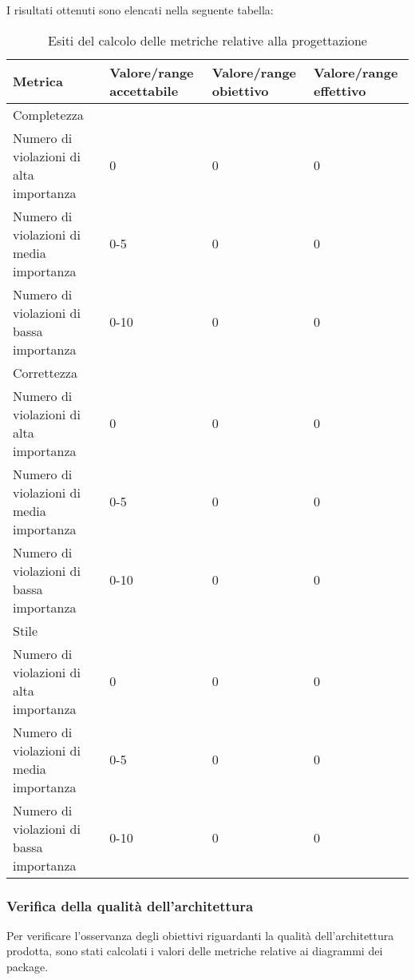 		I risultati ottenuti sono elencati nella seguente tabella:
		\begin{table}[H]
		\begin{tabular}{|l|p{2.25cm}|p{2.25cm}|p{2.25cm}|}
		\hline
		\textbf{Metrica} & \textbf{Valore/range accettabile} & \textbf{Valore/range obiettivo} & \textbf{Valore/range effettivo} \\
		\hline
		Completezza & ~ & ~ & ~ \\
		Numero di violazioni di alta importanza &0 & 0 &0 \\
		Numero di violazioni di media importanza &0-5 & 0 & 0 \\
		Numero di violazioni di bassa importanza &0-10 & 0 & 0 \\
		\hline
		Correttezza & ~ & ~ & ~ \\
		Numero di violazioni di alta importanza &0 & 0 & 0 \\
		Numero di violazioni di media importanza &0-5 & 0 & 0 \\
		Numero di violazioni di bassa importanza &0-10 & 0 & 0 \\
		\hline
		Stile & ~ & ~ & ~ \\
		Numero di violazioni di alta importanza &0 & 0 & 0 \\
		Numero di violazioni di media importanza &0-5 & 0 & 0 \\
		Numero di violazioni di bassa importanza &0-10 & 0 & 0 \\
		\hline
		\end{tabular}
		\caption{Esiti del calcolo delle metriche relative alla progettazione}
		\end{table}
		
		\subsubsection{Verifica della qualità dell'architettura}
		Per verificare l'osservanza degli obiettivi riguardanti la qualità dell'architettura prodotta, sono stati calcolati i valori delle metriche relative ai diagrammi dei package.
		

